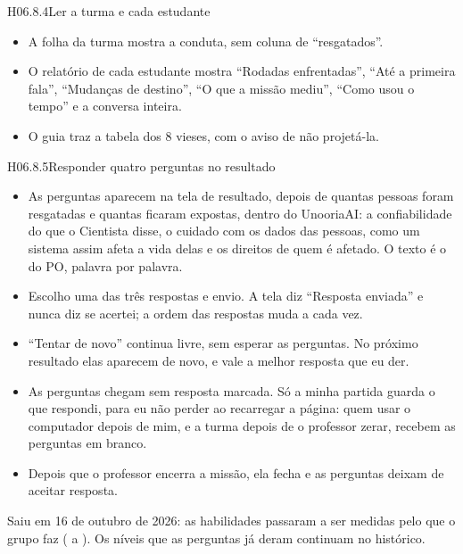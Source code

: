 \begin{historia}{H06.8.4}{Ler a turma e cada estudante}{\pronto}
\aceite
\begin{itemize}
  \item A folha da turma mostra a conduta, sem coluna de \enquote{resgatados}.
  \item O relatório de cada estudante mostra \enquote{Rodadas enfrentadas},
    \enquote{Até a primeira fala}, \enquote{Mudanças de destino},
    \enquote{O que a missão mediu}, \enquote{Como usou o tempo} e a conversa
    inteira.
  \item O guia traz a tabela dos 8 vieses, com o aviso de não projetá-la.
\end{itemize}
\end{historia}

\begin{historia}{H06.8.5}{Responder quatro perguntas no resultado}{\arquivada}
\aceite
\begin{itemize}
  \item As perguntas aparecem na tela de resultado, depois de quantas pessoas
    foram resgatadas e quantas ficaram expostas, dentro do UnooriaAI: a
    confiabilidade do que o Cientista disse, o cuidado com os dados das
    pessoas, como um sistema assim afeta a vida delas e os direitos de quem é
    afetado. O texto é o do PO, palavra por palavra.
  \item Escolho uma das três respostas e envio. A tela diz \enquote{Resposta
    enviada} e nunca diz se acertei; a ordem das respostas muda a cada vez.
  \item \enquote{Tentar de novo} continua livre, sem esperar as perguntas. No
    próximo resultado elas aparecem de novo, e vale a melhor resposta que eu
    der.
  \item As perguntas chegam sem resposta marcada. Só a minha partida guarda o
    que respondi, para eu não perder ao recarregar a página: quem usar o
    computador depois de mim, e a turma depois de o professor zerar, recebem as
    perguntas em branco.
  \item Depois que o professor encerra a missão, ela fecha e as perguntas
    deixam de aceitar resposta.
\end{itemize}
Saiu em 16 de outubro de 2026: as habilidades passaram a ser medidas pelo que
o grupo faz ( a ). Os níveis que as perguntas já deram
continuam no histórico.
\end{historia}

